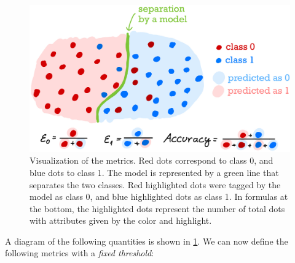 \begin{figure}[htb]
    \centering
    \includegraphics[width=1\linewidth]{src/img/metrics.jpg}
    \caption{Visualization of the metrics. Red dots correspond to class 0, and blue dots to class 1. The model is represented by a green line that separates the two classes. Red highlighted dots were tagged by the model as class 0, and blue highlighted dots as class 1. In formulas at the bottom, the highlighted dots represent the number of total dots with attributes given by the color and highlight.}
    \label{fig:metrics}
\end{figure}
A diagram of the following quantities is shown in \cref{fig:metrics}.
We can now define the following metrics with a \emph{fixed threshold}:
